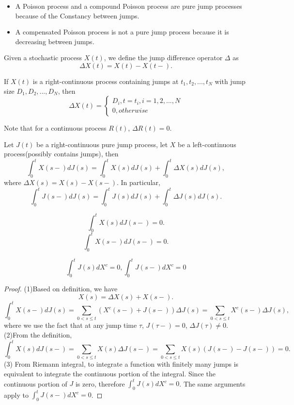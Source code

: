 \begin{refsection}
\begin{example}\hfill
	\begin{itemize}
		\item A Poisson process and a compound Poisson process are pure jump processes because of the Constancy between jumps.
		\item A compensated Poisson process is not a pure jump process because it is decreasing between jumps.
	\end{itemize}	
\end{example}


\begin{definition}
	Given a stochastic process $X(t)$, we define the jump difference operator $\Delta$ as
	$$\Delta X(t)  = X(t) - X(t-).$$
	
	If $X(t)$ is a right-continuous process containing jumps at $t_1,t_2,...,t_N$ with jump size $D_1,D_2,...,D_N$, then
	$$\Delta X(t) = \begin{cases*}
	D_i, t=t_i,i=1,2,...,N\\
	0, otherwise
	\end{cases*}$$	
	
	Note that for a continuous process $R(t)$, $\Delta R(t) = 0.$
\end{definition}



\begin{lemma}
	Let $J(t)$ be a right-continuous pure jump process, let $X$ be a left-continuous process(possibly contains jumps), then
	$$\int_0^t X(s-)dJ(s) = \int_0^t X(s)dJ(s) + \int_0^t \Delta X(s) dJ(s),$$
	where $\Delta X(s) = X(s) - X(s-)$.
	In particular, 
	$$\int_0^t J(s-)dJ(s) = \int_0^t J(s)dJ(s) + \int_0^t \Delta J(s) dJ(s).$$
	
	$$\int_0^t X(s)dJ(s-) = 0.$$
	$$\int_0^t X(s-)dJ(s-) = 0.$$
	
	$$\int_0^t J(s)dX^c = 0, \int_0^t J(s-)dX^c = 0 $$
\end{lemma}
\begin{proof}
	(1)Based on definition, we have
	$$X(s) = \Delta X(s) + X(s-).$$
	$$\int_0^t X(s-)dJ(s) = \sum_{0<s\leq t} (X^c(s-) + J(s-))\Delta J(s) = \sum_{0<s\leq t} X^c(s-)\Delta J(s),$$
	where we use the fact that at any jump time $\tau$, $J(\tau-) = 0$, $\Delta J(\tau) \neq 0$.
	(2)From the definition, 
	$$\int_0^t X(s)dJ(s-) = \sum_{0<s\leq t} X(s)\Delta J(s-) = \sum_{0<s\leq t} X(s)(J(s-) - J(s-)) = 0.$$
	(3) From Riemann integral, to integrate a function with finitely many jumps is equivalent to integrate the continuous portion of the integral. Since the continuous portion of $J$ is zero, therefore $\int_0^t J(s)dX^c = 0$. The same arguments apply to $\int_0^t J(s-)dX^c = 0$.
\end{proof}




\end{refsection}
